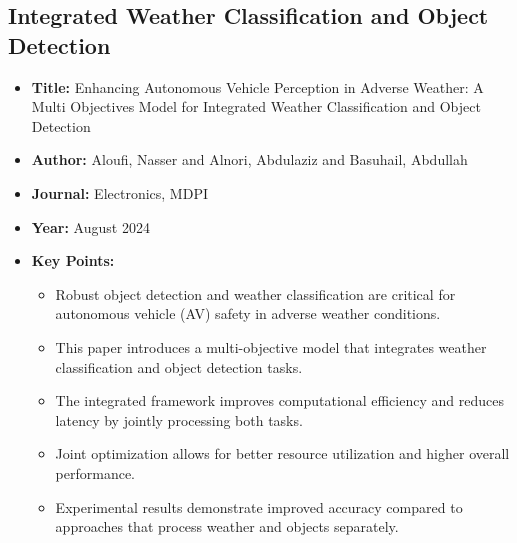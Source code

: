 \subsection{Integrated Weather Classification and Object Detection}
\begin{itemize}
    \item \textbf{Title:} Enhancing Autonomous Vehicle Perception in Adverse Weather: A Multi Objectives Model for Integrated Weather Classification and Object Detection \cite{aloufi2024enhancing}
    \item \textbf{Author:} Aloufi, Nasser and Alnori, Abdulaziz and Basuhail, Abdullah
    \item \textbf{Journal:} Electronics, MDPI
    \item \textbf{Year:} August 2024
    \item \textbf{Key Points:}
    \begin{itemize}
        \item Robust object detection and weather classification are critical for autonomous vehicle (AV) safety in adverse weather conditions.
        \item This paper introduces a multi-objective model that integrates weather classification and object detection tasks.
        \item The integrated framework improves computational efficiency and reduces latency by jointly processing both tasks.
        \item Joint optimization allows for better resource utilization and higher overall performance.
        \item Experimental results demonstrate improved accuracy compared to approaches that process weather and objects separately.
    \end{itemize}
\end{itemize}

